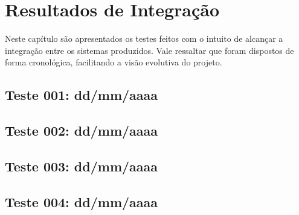 \chapter{Resultados de Integração}
Neste capítulo são apresentados os testes feitos com o intuito de alcançar
a integração entre os sistemas produzidos. Vale ressaltar que foram dispostos
de forma cronológica, facilitando a visão evolutiva do projeto.

\section{Teste 001: dd/mm/aaaa}
\section{Teste 002: dd/mm/aaaa}
\section{Teste 003: dd/mm/aaaa}
\section{Teste 004: dd/mm/aaaa}
